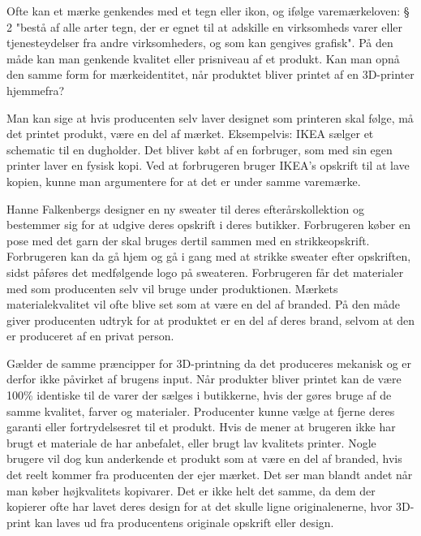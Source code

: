 Ofte kan et mærke genkendes med et tegn eller ikon, og ifølge varemærkeloven: § 2 "bestå af alle arter tegn, der er egnet til at adskille en virksomheds varer eller tjenesteydelser fra andre virksomheders, og som kan gengives grafisk". På den måde kan man genkende kvalitet eller prisniveau af et produkt. 
Kan man opnå den samme form for mærkeidentitet, når produktet bliver printet af en 3D-printer hjemmefra?

Man kan sige at hvis producenten selv laver designet som printeren skal følge, må det printet produkt, være en del af mærket. Eksempelvis: IKEA sælger et schematic til en dugholder. Det bliver købt af en forbruger, som med sin egen printer laver en fysisk kopi. Ved at forbrugeren bruger IKEA’s opskrift til at lave kopien, kunne man argumentere for at det er under samme varemærke. 

Hanne Falkenbergs\autocite{hanne_falkenberg_hanne_????} designer en ny sweater til deres efterårskollektion og bestemmer sig for at udgive deres opskrift i deres butikker. Forbrugeren køber en pose med det garn der skal bruges dertil sammen med en strikkeopskrift. Forbrugeren kan da gå hjem og gå i gang med at strikke sweater efter opskriften, sidst påføres det medfølgende logo på sweateren. Forbrugeren får det materialer med som producenten selv vil bruge under produktionen. Mærkets materialekvalitet vil ofte blive set som at være en del af branded.  På den måde giver producenten udtryk for at produktet er en del af deres brand, selvom at den er produceret af en privat person. 
																
Gælder de samme præncipper for 3D-printning da det produceres mekanisk og er derfor ikke påvirket af brugens input. Når produkter bliver printet kan de være 100\% identiske til de varer der sælges i butikkerne, hvis der gøres bruge af de samme kvalitet, farver og materialer.
Producenter kunne vælge at fjerne deres garanti eller fortrydelsesret til et produkt. Hvis de mener at brugeren ikke har brugt et materiale de har anbefalet, eller brugt lav kvalitets printer.
Nogle brugere vil dog kun anderkende et produkt som at være en del af branded, hvis det reelt kommer fra producenten der ejer mærket. Det ser man blandt andet når man køber højkvalitets kopivarer.\autocite{_vi_????}
Det er ikke helt det samme, da dem der kopierer ofte har lavet deres design for at det skulle ligne originalenerne, hvor 3D-print kan laves ud fra producentens originale opskrift eller design.



